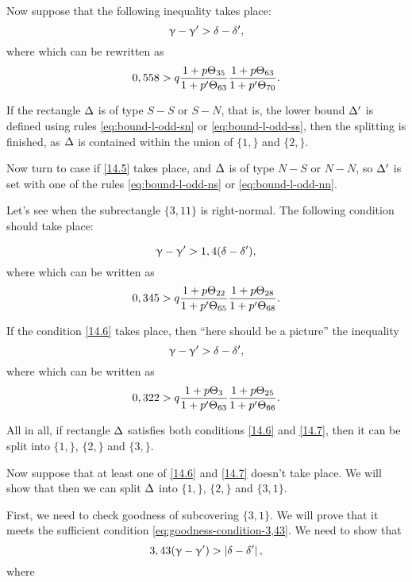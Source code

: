 Now suppose that the following inequality takes place:
\begin{equation*}
	\upgamma - \upgamma' > \delta - \delta',
\end{equation*}
where
which can be rewritten as
\begin{equation}\label{14.5}
	0,558 > q
	\dfrac{1 + p\Theta_{35}}{1 + p'\Theta_{63}}
	\dfrac{1 + p\Theta_{63}}{1 + p'\Theta_{70}}.
\end{equation}

If the rectangle $\Delta$ is of type $S-S$ or $S-N$,
that is, the lower bound $\Delta'$ is defined using rules \ref{eq:bound-l-odd-sn} or \ref{eq:bound-l-odd-ss},
then the splitting is finished, as $\Delta$ is contained within the union of $\{1,\}$ and $\{2,\}$.

Now turn to case if \ref{14.5} takes place,
and $\Delta$ is of type $N-S$ or $N-N$,
so $\Delta'$ is set with one of the rules \ref{eq:bound-l-odd-ns} or \ref{eq:bound-l-odd-nn}.

Let's see when the subrectangle $\{3, 11\}$ is right-normal.
The following condition should take place:

\begin{equation*}
	\upgamma - \upgamma' > 1,4 (\delta - \delta'),
\end{equation*}
where
which can be written as
\begin{equation}\label{14.6}
	0,345 > q
	\dfrac{1 + p\Theta_{22}}{1 + p'\Theta_{65}}
	\dfrac{1 + p\Theta_{28}}{1 + p'\Theta_{68}}.
\end{equation}

If the condition \ref{14.6} takes place, then ``here should be a picture''
the inequality
\begin{equation*}
	\upgamma - \upgamma' > \delta - \delta',
\end{equation*}
where
which can be written as
\begin{equation}\label{14.7}
	0,322 > q
	\dfrac{1 + p\Theta_{3}}{1 + p'\Theta_{63}}
	\dfrac{1 + p\Theta_{25}}{1 + p'\Theta_{66}}.
\end{equation}

All in all, if rectangle $\Delta$ satisfies both conditions \ref{14.6} and \ref{14.7},
then it can be split into $\{1,\}$, $\{2,\}$ and $\{3,\}$.

Now suppose that at least one of \ref{14.6} and \ref{14.7} doesn't take place.
We will show that then we can split $\Delta$ into $\{1,\}$, $\{2,\}$ and $\{3,1\}$.

First, we need to check goodness of subcovering $\{3,1\}$.
We will prove that it meets the sufficient condition \ref{eq:goodness-condition-3,43}.
We need to show that
\begin{equation}\label{14.8}
	3,43 (\upgamma - \upgamma') > \left| \delta - \delta' \right|,
\end{equation}
where

